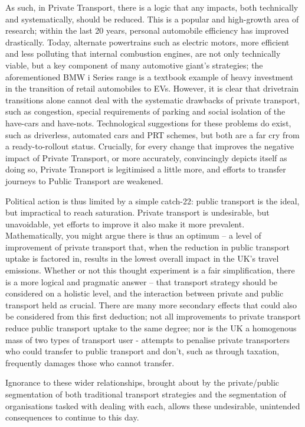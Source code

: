 \documentclass[conference]{IEEEtran}
\begin{document}
As such, in Private Transport, there is a logic that any impacts, both
technically and systematically, should be reduced. This is a popular
and high-growth area of research; within the last 20 years, personal
automobile efficiency has improved drastically. Today, alternate
powertrains such as electric motors, more efficient and less polluting
that internal combustion engines, are not only technically viable, but
a key component of many automotive giant’s strategies; the
aforementioned BMW i Series range is a textbook example of heavy
investment in the transition of retail automobiles to EVs. However, it
is clear that drivetrain transitions alone cannot deal with the
systematic drawbacks of private transport, such as congestion, special
requirements of parking and social isolation of the have-cars and
have-nots. Technological suggestions for these problems do exist, such
as driverless, automated cars and PRT schemes, but both are a far cry
from a ready-to-rollout status. Crucially, for every change that
improves the negative impact of Private Transport, or more accurately,
convincingly depicts itself as doing so, Private Transport is
legitimised a little more, and efforts to transfer journeys to Public
Transport are weakened.

Political action is thus limited by a simple catch-22: public
transport is the ideal, but impractical to reach saturation. Private
transport is undesirable, but unavoidable, yet efforts to improve it
also make it more prevalent. Mathematically, you might argue there is
thus an optimum -- a level of improvement of private transport that,
when the reduction in public transport uptake is factored in, results
in the lowest overall impact in the UK’s travel emissions. Whether or
not this thought experiment is a fair simplification, there is a more
logical and pragmatic answer -- that transport strategy should be
considered on a holistic level, and the interaction between private
and public transport held as crucial. There are many more secondary
effects that could also be considered from this first deduction; not
all improvements to private transport reduce public transport uptake
to the same degree; nor is the UK a homogenous mass of two types of
transport user - attempts to penalise private transporters who could
transfer to public transport and don’t, such as through taxation,
frequently damages those who cannot transfer.

Ignorance to these wider relationships, brought about by the
private/public segmentation of both traditional transport strategies
and the segmentation of organisations tasked with dealing with each,
allows these undesirable, unintended consequences to continue to this
day.
\end{document}
